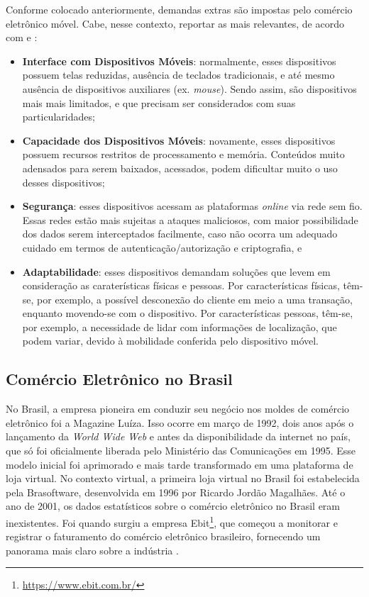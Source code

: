 Conforme colocado anteriormente, demandas extras são impostas pelo comércio eletrônico móvel. Cabe, nesse contexto, reportar as mais relevantes, de acordo com  e :

\begin{itemize}
    \item \textbf{Interface com Dispositivos Móveis}: normalmente, esses dispositivos possuem telas reduzidas, ausência de teclados tradicionais, e até mesmo ausência de dispositivos auxiliares (ex. \textit{mouse}). Sendo assim, são dispositivos mais mais limitados, e que precisam ser considerados com suas particularidades;
    
    \item \textbf{Capacidade dos Dispositivos Móveis}: novamente, esses dispositivos possuem recursos restritos de processamento e memória. Conteúdos muito adensados para serem baixados, acessados, podem dificultar muito o uso desses dispositivos;
    
    \item \textbf{Segurança}: esses dispositivos acessam as plataformas \textit{online} via rede sem fio. Essas redes estão mais sujeitas a ataques maliciosos, com maior possibilidade dos dados serem interceptados facilmente, caso não ocorra um adequado cuidado em termos de autenticação/autorização e criptografia, e
    
    \item \textbf{Adaptabilidade}: esses dispositivos demandam soluções que levem em consideração as caraterísticas físicas e pessoas. Por características físicas, têm-se, por exemplo, a possível desconexão do cliente em meio a uma transação, enquanto movendo-se com o dispositivo. Por características pessoas, têm-se, por exemplo, a necessidade de lidar com informações de localização, que podem variar, devido à mobilidade conferida pelo dispositivo móvel.
\end{itemize} 


\subsection{Comércio Eletrônico no Brasil}

No Brasil, a empresa pioneira em conduzir seu negócio nos moldes de comércio eletrônico foi a Magazine Luíza. Isso ocorre em março de 1992, dois anos após o lançamento da \textit{World Wide Web} e antes da disponibilidade da internet no país, que só foi oficialmente liberada pelo Ministério das Comunicações em 1995. Esse modelo inicial foi aprimorado e mais tarde transformado em uma plataforma de loja virtual. No contexto virtual, a primeira loja virtual no Brasil foi estabelecida pela Brasoftware, desenvolvida em 1996 por Ricardo Jordão Magalhães. Até o ano de 2001, os dados estatísticos sobre o comércio eletrônico no Brasil eram inexistentes. Foi quando surgiu a empresa Ebit\footnote{\url{https://www.ebit.com.br/}}, que começou a monitorar e registrar o faturamento do comércio eletrônico brasileiro, fornecendo um panorama mais claro sobre a indústria \cite{MendoncaEcommerce}.

